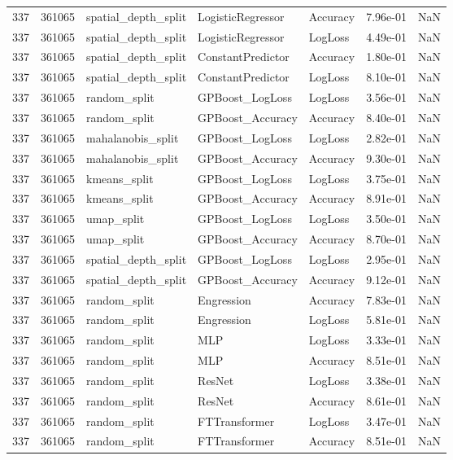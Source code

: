 \begin{tabular}{rrlllrr}
337 & 361065 & spatial\_depth\_split & LogisticRegressor & Accuracy & 7.96e-01 & NaN \\
337 & 361065 & spatial\_depth\_split & LogisticRegressor & LogLoss & 4.49e-01 & NaN \\
337 & 361065 & spatial\_depth\_split & ConstantPredictor & Accuracy & 1.80e-01 & NaN \\
337 & 361065 & spatial\_depth\_split & ConstantPredictor & LogLoss & 8.10e-01 & NaN \\
337 & 361065 & random\_split & GPBoost\_LogLoss & LogLoss & 3.56e-01 & NaN \\
337 & 361065 & random\_split & GPBoost\_Accuracy & Accuracy & 8.40e-01 & NaN \\
337 & 361065 & mahalanobis\_split & GPBoost\_LogLoss & LogLoss & 2.82e-01 & NaN \\
337 & 361065 & mahalanobis\_split & GPBoost\_Accuracy & Accuracy & 9.30e-01 & NaN \\
337 & 361065 & kmeans\_split & GPBoost\_LogLoss & LogLoss & 3.75e-01 & NaN \\
337 & 361065 & kmeans\_split & GPBoost\_Accuracy & Accuracy & 8.91e-01 & NaN \\
337 & 361065 & umap\_split & GPBoost\_LogLoss & LogLoss & 3.50e-01 & NaN \\
337 & 361065 & umap\_split & GPBoost\_Accuracy & Accuracy & 8.70e-01 & NaN \\
337 & 361065 & spatial\_depth\_split & GPBoost\_LogLoss & LogLoss & 2.95e-01 & NaN \\
337 & 361065 & spatial\_depth\_split & GPBoost\_Accuracy & Accuracy & 9.12e-01 & NaN \\
337 & 361065 & random\_split & Engression & Accuracy & 7.83e-01 & NaN \\
337 & 361065 & random\_split & Engression & LogLoss & 5.81e-01 & NaN \\
337 & 361065 & random\_split & MLP & LogLoss & 3.33e-01 & NaN \\
337 & 361065 & random\_split & MLP & Accuracy & 8.51e-01 & NaN \\
337 & 361065 & random\_split & ResNet & LogLoss & 3.38e-01 & NaN \\
337 & 361065 & random\_split & ResNet & Accuracy & 8.61e-01 & NaN \\
337 & 361065 & random\_split & FTTransformer & LogLoss & 3.47e-01 & NaN \\
337 & 361065 & random\_split & FTTransformer & Accuracy & 8.51e-01 & NaN \\

\end{tabular}
